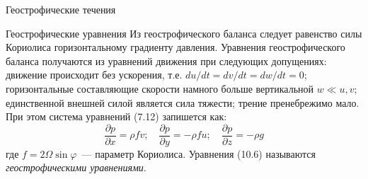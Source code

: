 \begin{chapter}{Геострофические течения}
\begin{section}{Геострофические уравнения}
Из геострофического баланса следует равенство силы Кориолиса
горизонтальному градиенту давления. Уравнения геострофического баланса
получаются из уравнений движения при следующих допущениях: движение
происходит без ускорения, т.е. $du/dt = dv/dt = dw/dt = 0$; горизонтальные
составляющие скорости намного больше вертикальной $w \ll u,v$;
единственной внешней силой является сила тяжести; трение пренебрежимо
мало. При этом система уравнений (7.12) запишется как:
\begin{equation}
 \frac{\partial p}{\partial x}= \rho fv; \quad
 \frac{\partial p}{\partial y}= - \rho f u; \quad
 \frac{\partial p}{\partial z}= - \rho g
\end{equation}
где $f = 2 \Omega \sin \varphi$~--- параметр Кориолиса. 
Уравнения (10.6) называются \emph{геострофическими уравнениями}.
%


\end{section}
\end{chapter}
